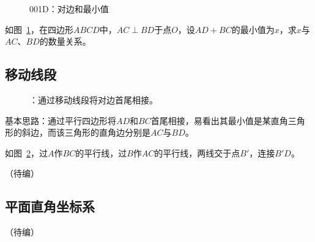 

\begin{figure}[htbp]
  \centering
  \caption{001D：对边和最小值} \label{fig:001D}
\end{figure}

如图~\ref{fig:001D}，在四边形$ABCD$中，$AC \perp BD$于点$O$，设$AD + BC$的最小值为$x$，求$x$与$AC$、$BD$的数量关系。


\subsection{移动线段} \label{subsec:001D-mv}

\begin{figure}[htbp]
  \centering
  \caption{：通过移动线段将对边首尾相接。}
  \label{fig:001D-mv}
\end{figure}

基本思路：通过平行四边形将$AD$和$BC$首尾相接，易看出其最小值是某直角三角形的斜边，而该三角形的直角边分别是$AC$与$BD$。

如图~\ref{fig:001D-mv}，过$A$作$BC$的平行线，过$B$作$AC$的平行线，两线交于点$B'$，连接$B'D$。

（待编）

\subsection{平面直角坐标系}

（待编）
